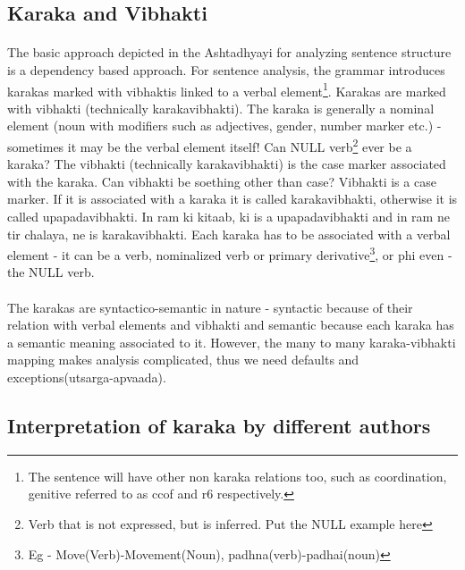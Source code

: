 \documentclass[a4paper,10pt]{article}
\begin{document}
\subsection{Karaka and Vibhakti}
\paragraph{}
\color{black!100}The basic approach depicted in the Ashtadhyayi for analyzing sentence structure is a dependency based approach. For sentence analysis, the grammar introduces karakas marked with vibhaktis linked to a verbal element\footnote[1]{The sentence will have other non karaka relations too, such as coordination, genitive referred to as ccof and r6 respectively.}. Karakas are marked with vibhakti (technically karakavibhakti). The karaka is generally a nominal element (noun with \color{blue!100}modifiers such as adjectives, gender, number marker etc.\color{black!100}) - sometimes it may be the verbal element itself! \color{red!100}Can NULL verb\footnote[2]{Verb that is not expressed, but is inferred. Put the NULL example here} ever be a karaka? \color{black!100}The vibhakti (technically karakavibhakti) is the case marker associated with the karaka. \color{red!100}Can vibhakti be soething other than case? \color{black!100}Vibhakti is a \color{blue!100}case marker\color{black!100}. If it is associated with a karaka it is called karakavibhakti, otherwise it is called upapadavibhakti. \color{purple!100}In ram ki kitaab, ki is a upapadavibhakti and in ram ne tir chalaya, ne is karakavibhakti. \color{black!100}Each karaka has to be associated with a verbal element - it can be a \color{blue!100}verb, nominalized verb or primary derivative\footnote[3]{Eg - Move(Verb)-Movement(Noun), padhna(verb)-padhai(noun)}, or phi even - the NULL verb.

\paragraph{}
\color{black!100}The karakas are syntactico-semantic in nature - syntactic because of their relation with verbal elements and vibhakti and semantic because each karaka has a semantic meaning associated to it. However, the many to many karaka-vibhakti mapping makes analysis complicated, thus we need defaults and exceptions(utsarga-apvaada).

\subsection{Interpretation of karaka by different authors}
\end{document}
